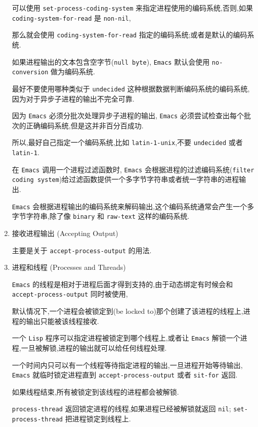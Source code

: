 \documentclass[11pt]{article}
\begin{document}
\begin{enumerate}
可以使用 \texttt{set-process-coding-system} 来指定进程使用的编码系统,否则,如果 \texttt{coding-system-for-read} 是 \texttt{non-nil},

那么就会使用 \texttt{coding-system-for-read} 指定的编码系统;或者是默认的编码系统.

如果进程输出的文本包含空字节(\texttt{null byte}), \texttt{Emacs} 默认会使用 \texttt{no-conversion} 做为编码系统.

最好不要使用哪种类似于 \texttt{undecided} 这种根据数据判断编码系统的编码系统,因为对于异步子进程的输出不完全可靠.

因为 \texttt{Emacs} 必须分批次处理异步子进程的输出, \texttt{Emacs} 必须尝试检查出每个批次的正确编码系统,但是这并非百分百成功.

所以,最好自己指定一个编码系统,比如 \texttt{latin-1-unix},不要 \texttt{undecided} 或者 \texttt{latin-1}.

在 \texttt{Emacs} 调用一个进程过滤函数时, \texttt{Emacs} 会根据进程的过滤编码系统(\texttt{filter coding system})给过滤函数提供一个多字节字符串或者统一字符串的进程输出.

\texttt{Emacs} 会根据进程输出的编码系统来解码输出,这个编码系统通常会产生一个多字节字符串,除了像 \texttt{binary} 和 \texttt{raw-text} 这样的编码系统.




\item 接收进程输出 (Accepting Output)
\label{sec:org5347f3f}

主要是关于 \texttt{accept-process-output} 的用法.


\item 进程和线程 (Processes and Threads)
\label{sec:org66faefb}

\texttt{Emacs} 的线程是相对于进程后面才得到支持的,由于动态绑定有时候会和 \texttt{accept-process-output} 同时被使用,

默认情况下,一个进程会被锁定到(be locked to)那个创建了该进程的线程上,进程的输出只能被该线程接收.

一个 \texttt{Lisp} 程序可以指定进程被锁定到哪个线程上,或者让 \texttt{Emacs} 解锁一个进程,一旦被解锁,进程的输出就可以给任何线程处理.

一个时间内只可以有一个线程等待指定进程的输出,一旦进程开始等待输出, \texttt{Emacs} 就临时锁定进程直到 \texttt{accept-process-output} 或者 \texttt{sit-for} 返回.

如果线程结束,所有被锁定到该线程的进程都会被解锁.

\texttt{process-thread} 返回锁定进程的线程,如果进程已经被解锁就返回 \texttt{nil}; \texttt{set-process-thread} 把进程锁定到线程上.
\end{enumerate}
\end{document}
